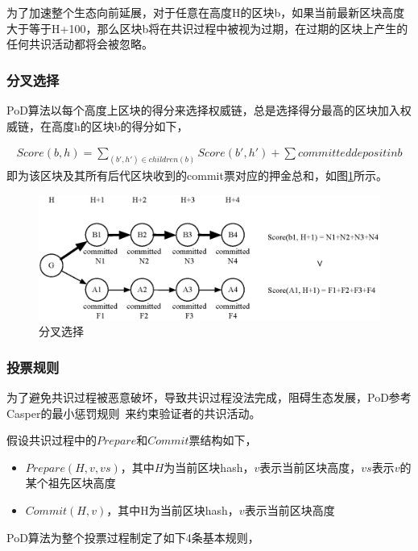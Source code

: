 为了加速整个生态向前延展，对于任意在高度H的区块b，如果当前最新区块高度大于等于H+100，那么区块b将在共识过程中被视为过期，在过期的区块上产生的任何共识活动都将会被忽略。

\subsubsection{分叉选择}
\label{PoD:design:fork}

PoD算法以每个高度上区块的得分来选择权威链，总是选择得分最高的区块加入权威链，在高度h的区块b的得分如下，

\begin{align}
Score(b, h) = \sum_{(b',h') \in children(b)}Score(b', h') + \sum committed deposit in b
\end{align}
\noindent 即为该区块及其所有后代区块收到的commit票对应的押金总和，如图\ref{fig:fork_choice}所示。

\begin{figure}[h]
\centering
\includegraphics[width=12cm]{./figs/fork}
\caption{分叉选择}
\label{fig:fork_choice}
\end{figure}

\subsubsection{投票规则}
\label{PoD:design:vote}

为了避免共识过程被恶意破坏，导致共识过程没法完成，阻碍生态发展，PoD参考Casper的最小惩罚规则~\cite{minimal_slash_rules}来约束验证者的共识活动。

假设共识过程中的$Prepare$和$Commit$票结构如下，
\begin{itemize}
\item $Prepare(H, v, vs)$，其中$H$为当前区块hash，$v$表示当前区块高度，$vs$表示$v$的某个祖先区块高度
\item $Commit(H, v)$，其中H为当前区块hash，$v$表示当前区块高度
\end{itemize}

PoD算法为整个投票过程制定了如下4条基本规则，

